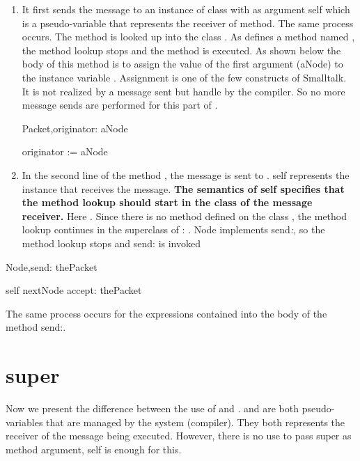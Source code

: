 \begin{enumerate}
    \item
It first sends the message  to an instance of class  with 
as argument self which is a pseudo-variable that represents the 
receiver of  method. The same process occurs. The method  
is looked up into the class . As  defines a method 
named , the method lookup stops and the method is executed. 
As shown below the body of this method is to assign the value 
of the first argument (aNode) to the instance variable . 
Assignment is one of the few constructs of Smalltalk. It is not 
realized by a message sent but handle by the compiler. So no 
more message sends are performed for this part of .

\begin{scode}
Packet\sep{}originator: aNode

      originator := aNode
\end{scode}

\item
In the second line of the method , the message  is sent to . self represents the instance that receives 
the  message. \textbf{The semantics of self specifies that 
the method lookup should start in the class of the message receiver.} 
Here . Since there is no method  defined on the 
class , the method lookup continues in the superclass 
of : . Node implements send\textit{:}, so the method 
lookup stops and send: is invoked

\end{enumerate}

\begin{scode}
 Node\sep{}send: thePacket

      self nextNode accept: thePacket
\end{scode}

The same process occurs for the expressions contained into the 
body of the method send:. 



\section{super}


Now we present the difference between the use of  and . 
 and  are both pseudo-variables that are managed by 
the system (compiler). They both represents the receiver of the 
message being executed. However, there is no use to pass super 
as method argument, self is enough for this.

